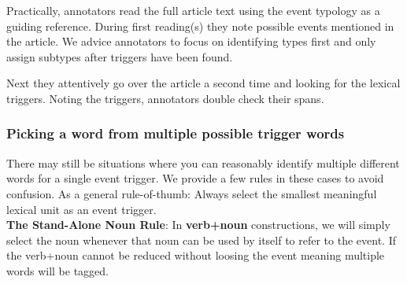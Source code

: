 Practically, annotators read the full article text using the event typology as a guiding reference.
During first reading(s) they note possible events mentioned in the article.
We advice annotators to focus on identifying types first and only assign subtypes after triggers have been found.

Next they attentively go over the article a second time and looking for the lexical triggers.
Noting the triggers, annotators double check their spans.





\subsubsection{Picking a word from multiple possible trigger words}

There may still be situations where you can reasonably identify multiple different words for a single event trigger. We provide a few rules in these cases to avoid confusion. As a general rule-of-thumb: Always select the smallest meaningful lexical unit as an event trigger.
\\[10pt]
\noindent\textbf{The Stand-Alone Noun Rule}:
In \textbf{verb+noun} constructions, we will simply select the noun whenever that noun can be used by itself to refer to the event.
If the verb+noun cannot be reduced without loosing the event meaning multiple words will be tagged.

